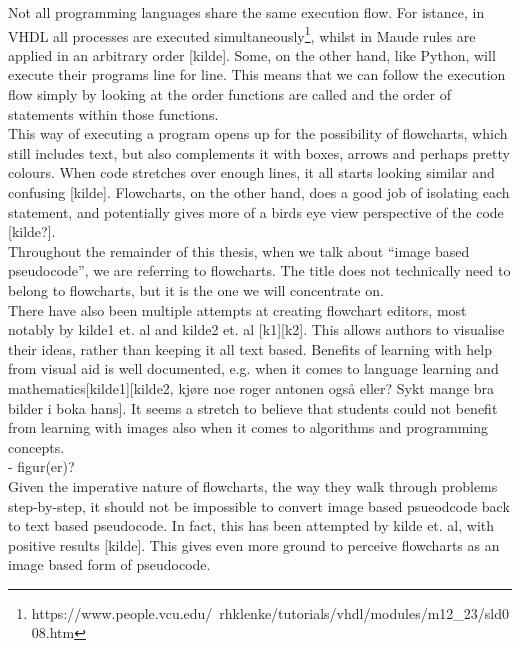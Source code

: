 Not all programming languages share the same execution flow. For istance, in VHDL all processes are executed simultaneously\footnote{https://www.people.vcu.edu/~rhklenke/tutorials/vhdl/modules/m12\_23/sld008.htm}, whilst in Maude rules are applied in an arbitrary order [kilde]. Some, on the other hand, like Python, will execute their programs line for line. This means that we can follow the execution flow simply by looking at the order functions are called and the order of statements within those functions. \hfill \\

This way of executing a program opens up for the possibility of flowcharts, which still includes text, but also complements it with boxes, arrows and perhaps pretty colours. When code stretches over enough lines, it all starts looking similar and confusing [kilde]. Flowcharts, on the other hand, does a good job of isolating each statement, and potentially gives more of a birds eye view perspective of the code [kilde?]. \hfill \\

Throughout the remainder of this thesis, when we talk about ``image based pseudocode'', we are referring to flowcharts. The title does not technically need to belong to flowcharts, but it is the one we will concentrate on. \hfill \\

There have also been multiple attempts at creating flowchart editors, most notably by kilde1 et. al and kilde2 et. al [k1][k2]. This allows authors to visualise their ideas, rather than keeping it all text based. Benefits of learning with help from visual aid is well documented, e.g. when it comes to language learning and mathematics[kilde1][kilde2, kjøre noe roger antonen også eller? Sykt mange bra bilder i boka hans]. It seems a stretch to believe that students could not benefit from learning with images also when it comes to algorithms and programming concepts. \hfill \\

- figur(er)? \\

Given the imperative nature of flowcharts, the way they walk through problems step-by-step, it should not be impossible to convert image based psueodcode back to text based pseudocode. In fact, this has been attempted by kilde et. al, with positive results [kilde]. This gives even more ground to perceive flowcharts as an image based form of pseudocode. \hfill \\

